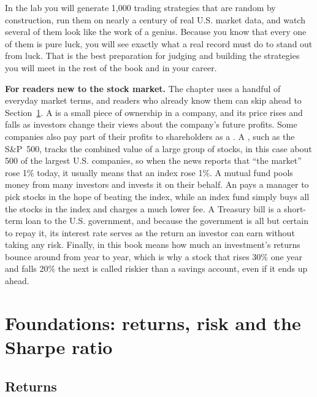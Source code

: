 In the lab you will generate 1,000 trading strategies that are random by construction, run them on nearly a century of real U.S. market data, and watch several of them look like the work of a genius. Because you know that every one of them is pure luck, you will see exactly what a real record must do to stand out from luck. That is the best preparation for judging and building the strategies you will meet in the rest of the book and in your career.

\begin{callout}
\textbf{For readers new to the stock market.} The chapter uses a handful of everyday market terms, and readers who already know them can skip ahead to Section~\ref{sec:01-foundations}. A  is a small piece of ownership in a company, and its price rises and falls as investors change their views about the company's future profits. Some companies also pay part of their profits to shareholders as a . A , such as the S\&P~500, tracks the combined value of a large group of stocks, in this case about 500 of the largest U.S. companies, so when the news reports that ``the market'' rose 1\% today, it usually means that an index rose 1\%. A mutual fund pools money from many investors and invests it on their behalf. An  pays a manager to pick stocks in the hope of beating the index, while an index fund simply buys all the stocks in the index and charges a much lower fee. A Treasury bill is a short-term loan to the U.S. government, and because the government is all but certain to repay it, its interest rate serves as the return an investor can earn without taking any risk. Finally,  in this book means how much an investment's returns bounce around from year to year, which is why a stock that rises 30\% one year and falls 20\% the next is called riskier than a savings account, even if it ends up ahead.
\end{callout}



\section{Foundations: returns, risk and the Sharpe ratio}
\label{sec:01-foundations}

\subsection{Returns}

